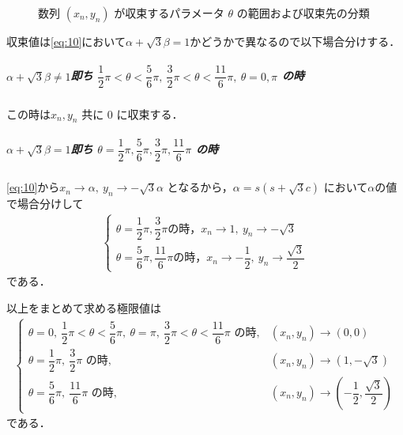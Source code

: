 \documentclass[../../main.tex]{subfiles}
\begin{document}
\begin{figure}[htb]
  \caption{数列 $(x_n, y_n)$ が収束するパラメータ $\theta$ の範囲および収束先の分類}
  \label{fig:convergence_theta_range}
\end{figure}

収束値は\cref{eq:10}において$\alpha+\sqrt{3}\beta=1$かどうかで異なるので以下場合分けする．

\subparagraph{$\alpha+\sqrt{3}\beta\neq 1$即ち $\dfrac{1}{2}\pi < \theta < \dfrac{5}{6}\pi, \ \dfrac{3}{2}\pi < \theta < \dfrac{11}{6}\pi, \ \theta = 0, \pi$ の時}

この時は$x_n, y_n$ 共に 0 に収束する．

\subparagraph{$\alpha+\sqrt{3}\beta=1$即ち $\theta = \dfrac{1}{2}\pi, \dfrac{5}{6}\pi, \dfrac{3}{2}\pi, \dfrac{11}{6}\pi$ の時}

\cref{eq:10}から$x_n \to \alpha, \ y_n \to -\sqrt{3}\alpha$ となるから，$\alpha = s(s + \sqrt{3}c)$ において$\alpha$の値で場合分けして
\begin{align}
  \begin{cases}
    \theta = \dfrac{1}{2}\pi, \dfrac{3}{2}\pi \text{の時，} x_n \to 1, \ y_n \to -\sqrt{3} \\
    \theta = \dfrac{5}{6}\pi, \dfrac{11}{6}\pi \text{の時，} x_n \to -\dfrac{1}{2}, \ y_n \to \dfrac{\sqrt{3}}{2}
  \end{cases}
\end{align}
である．
\casesend

以上をまとめて求める極限値は
\begin{align}
  \begin{cases}
    \theta = 0, \ \dfrac{1}{2}\pi < \theta < \dfrac{5}{6}\pi, \ \theta = \pi, \ \dfrac{3}{2}\pi < \theta < \dfrac{11}{6}\pi \text{ の時}, & (x_n, y_n) \longrightarrow (0, 0) \\
    \theta = \dfrac{1}{2}\pi, \ \dfrac{3}{2}\pi \text{ の時}, & (x_n, y_n) \longrightarrow (1, -\sqrt{3}) \\
    \theta = \dfrac{5}{6}\pi, \ \dfrac{11}{6}\pi \text{ の時}, & (x_n, y_n) \longrightarrow \left(-\dfrac{1}{2}, \dfrac{\sqrt{3}}{2}\right)
  \end{cases}
\end{align}
である．

\newpage
\end{document}
